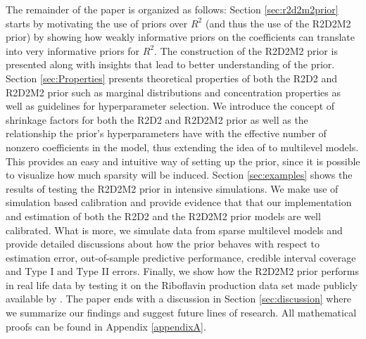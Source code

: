The remainder of the paper is organized as follows: Section \ref{sec:r2d2m2prior} starts by motivating the use of priors over $R^2$ (and thus the use of the R2D2M2 prior) by showing how weakly informative priors on the coefficients can translate into very informative priors for $R^2$. The construction of the R2D2M2 prior is presented along with insights that lead to better understanding of the prior. Section \ref{sec:Properties} presents theoretical properties of both the R2D2 and R2D2M2 prior such as marginal distributions and concentration properties as well as guidelines for hyperparameter selection. We introduce the concept of shrinkage factors for both the R2D2 and R2D2M2 prior as well as the relationship the prior's hyperparameters have with the effective number of nonzero coefficients in the model, thus extending the idea of \cite{PiironenHorseshoe} to multilevel models. This provides an easy and intuitive way of setting up the prior, since it is possible to visualize how much sparsity will be induced. Section \ref{sec:examples} shows the results of testing the R2D2M2 prior in intensive simulations. We make use of simulation based calibration \citep{taltssbc} and provide evidence that that our implementation and estimation of both the R2D2 and the R2D2M2 prior models are well calibrated. What is more, we simulate data from sparse multilevel models and provide detailed discussions about how the prior behaves with respect to estimation error, out-of-sample predictive performance, credible interval coverage and Type I and Type II errors. Finally, we show how the R2D2M2 prior performs in real life data by testing it on the Riboflavin production data set made publicly available by \cite{BuehlmannBio}.
The paper ends with a discussion in Section \ref{sec:discussion} where we summarize our findings and suggest future lines of research. All mathematical proofs can be found in  Appendix \ref{appendixA}.
